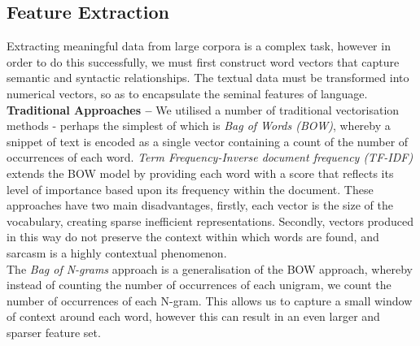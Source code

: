 \documentclass[12pt,a4paper]{article}
\begin{document}

\subsection{Feature Extraction}
\noindent Extracting meaningful data from large corpora is a complex task, however in order to do this successfully, we must first construct word vectors that capture semantic and syntactic relationships. The textual data must be transformed into numerical vectors, so as to encapsulate the seminal features of language.\\

\noindent \textbf{Traditional Approaches --} We utilised a number of traditional vectorisation methods - perhaps the simplest of which is \textit{Bag of Words (BOW)}, whereby a snippet of text is encoded as a single vector containing a count of the number of occurrences of each word. \textit{Term Frequency-Inverse document frequency (TF-IDF)} \cite{robertson1976relevance} extends the BOW model by providing each word with a score that reflects its level of importance based upon its frequency within the document. These approaches have two main disadvantages, firstly, each vector is the size of the vocabulary, creating sparse inefficient representations. Secondly, vectors produced in this way do not preserve the context within which words are found, and sarcasm is a highly contextual phenomenon. \\The \textit{Bag of N-grams} approach is a generalisation of the BOW approach, whereby instead of counting the number of occurrences of each unigram, we count the number of occurrences of each N-gram. This allows us to capture a small window of context around each word, however this can result in an even larger and sparser feature set.\\
\end{document}
